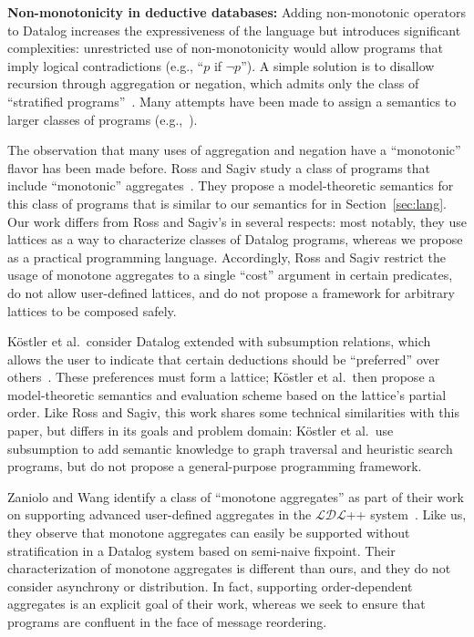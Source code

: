\vspace{0.5em}\noindent
\textbf{Non-monotonicity in deductive databases:} Adding non-monotonic operators
to Datalog increases the expressiveness of the language but introduces
significant complexities: unrestricted use of non-monotonicity would allow
programs that imply logical contradictions (e.g., ``$p$ if $\lnot p$''). A
simple solution is to disallow recursion through aggregation or negation, which
admits only the class of ``stratified programs''~\cite{Apt1988}. Many attempts
have been made to assign a semantics to larger classes of programs
(e.g.,~\cite{Gelfond1988,Ross1990,VanGelder1991}).

The observation that many uses of aggregation and negation have a ``monotonic''
flavor has been made before. Ross and Sagiv study a class of programs that
include ``monotonic'' aggregates~\cite{Ross1992}. They propose a model-theoretic
semantics for this class of programs that is similar to our semantics for \lang
in Section~\ref{sec:lang}. Our work differs from Ross and Sagiv's in several
respects: most notably, they use lattices as a way to characterize classes of
Datalog programs, whereas we propose \lang as a practical programming
language. Accordingly, Ross and Sagiv restrict the usage of monotone aggregates
to a single ``cost'' argument in certain predicates, do not allow user-defined
lattices, and do not propose a framework for arbitrary lattices to be composed
safely.

K\"{o}stler et al.\ consider Datalog extended with subsumption relations, which
allows the user to indicate that certain deductions should be ``preferred'' over
others~\cite{Kostler1995}. These preferences must form a lattice; K\"{o}stler et
al.\ then propose a model-theoretic semantics and evaluation scheme based on the
lattice's partial order. Like Ross and Sagiv, this work shares some technical
similarities with this paper, but differs in its goals and problem domain:
K\"{o}stler et al.\ use subsumption to add semantic knowledge to graph traversal
and heuristic search programs, but do not propose a general-purpose programming
framework.

Zaniolo and Wang identify a class of ``monotone aggregates'' as part of their
work on supporting advanced user-defined aggregates in the $\mathcal{LDL}$++
system~\cite{Zaniolo1999}. Like us, they observe that monotone aggregates can
easily be supported without stratification in a Datalog system based on
semi-naive fixpoint. Their characterization of monotone aggregates is different
than ours, and they do not consider asynchrony or distribution.  In fact,
supporting order-dependent aggregates is an explicit goal of their work, whereas
we seek to ensure that programs are confluent in the face of message reordering.
